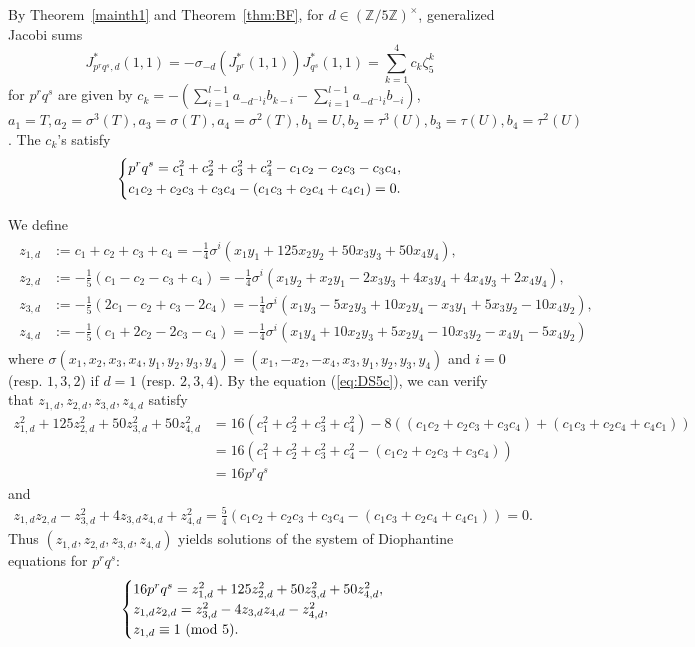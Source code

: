 \documentclass[a4paper, 11pt]{amsart}
\newcommand{\Z}{\mathbb Z}
\theoremstyle{plain}
\theoremstyle{definition}
\numberwithin{equation}{section}
\begin{document}
By Theorem~\ref{mainth1} and Theorem~\ref{thm:BF},
for $d\in(\Z/5\Z)^{\times}$, generalized Jacobi sums
\[
J^\ast_{p^rq^s,d}(1,1)=
-\sigma_{-d}(J^\ast_{p^r}(1,1))J^\ast_{q^s}(1,1)=\sum_{k=1}^{4}c_k\zeta_5^k
\]
for $p^rq^s$ are given by
$c_k=-(\sum_{i=1}^{l-1}a_{-d^{-1}i}b_{k-i} - \sum_{i=1}^{l-1}a_{-d^{-1}i}b_{-i})$, 
$a_1=T, a_2=\sigma^3(T), a_3=\sigma(T), a_4=\sigma^2(T), b_1=U, b_2=\tau^3(U), b_3=\tau(U), b_4=\tau^2(U)$.
The $c_k$'s satisfy
\begin{align}\label{eq:DS5c}
\begin{dcases}
p^rq^s
=c_1^2+c_2^2+c_3^2+c_4^2-c_1c_2-c_2c_3-c_3c_4, \\
c_1c_2+c_2c_3+c_3c_4 - (c_1c_3+c_2c_4+c_4c_1)=0.
\end{dcases}
\end{align}

We define 
\begin{align*} %
\begin{split}
z_{1,d}&:=c_1+c_2+c_3+c_4=-\frac{1}{4}\sigma^i\left(x_1y_1 + 125x_2y_2 + 50x_3y_3 + 50x_4y_4\right),\\
z_{2,d}&:=-\frac{1}{5}\left(c_1-c_2-c_3+c_4\right)=-\frac{1}{4}\sigma^i\left(x_1y_2 + x_2y_1 - 2x_3y_3 + 4x_3y_4 + 4x_4y_3  + 2x_4y_4\right),\\
z_{3,d}&:=-\frac{1}{5}\left(2c_1-c_2+c_3-2c_4\right)=-\frac{1}{4}\sigma^i\left( x_1y_3 - 5x_2y_3 + 10x_2y_4 - x_3y_1 + 5x_3y_2 - 10x_4y_2 \right),\\
z_{4,d}&:=-\frac{1}{5}\left(c_1+2c_2-2c_3-c_4\right)=-\frac{1}{4}\sigma^i\left(x_1y_4 + 10x_2y_3 + 5x_2y_4 - 10x_3y_2 - x_4y_1 - 5x_4y_2  \right)
\end{split}
\end{align*}
where $\sigma(x_1,x_2,x_3,x_4,y_1,y_2,y_3,y_4)=(x_1,-x_2,-x_4,x_3,y_1,y_2,y_3,y_4)$ and $i=0$ 
(resp. $1,3,2$) if $d=1$ (resp. $2,3,4$). 
By the equation (\ref{eq:DS5c}), 
we can verify that $z_{1,d},z_{2,d},z_{3,d}, z_{4,d}$ satisfy
\begin{align*}
z_{1,d}^2+125z_{2,d}^2+50z_{3,d}^2+50z_{4,d}^2
&=16(c_1^2 + c_2^2 + c_3^2 + c_4^2) - 8( (c_1c_2  +  c_2c_3 + c_3c_4) +( c_1c_3 + c_2c_4 + c_4c_1))\\
&=16(c_1^2+c_2^2+c_3^2+c_4^2-(c_1c_2+c_2c_3+c_3c_4))\\
&=16p^rq^s
\end{align*}
and
\begin{align*}
z_{1,d}z_{2,d}-z_{3,d}^2+4z_{3,d}z_{4,d}+z_{4,d}^2=\frac{5}{4}\left(c_1c_2 + c_2c_3 + c_3c_4 - (c_1c_3 + c_2c_4 + c_4c_1)\right)=0.
\end{align*}
Thus $(z_{1,d},z_{2,d},z_{3,d},z_{4,d})$
yields solutions of the system of Diophantine equations 
for $p^rq^s$:
\begin{align*}
\begin{cases}
16p^rq^s=z_{1,d}^2+125z_{2,d}^2+50z_{3,d}^2+50z_{4,d}^2,\\
z_{1,d}z_{2,d}=z_{3,d}^2-4z_{3,d}z_{4,d}-z_{4,d}^2, \\
z_{1,d} \equiv 1\ ({\rm mod}\ 5). 
\end{cases}
\end{align*}
\end{document}
